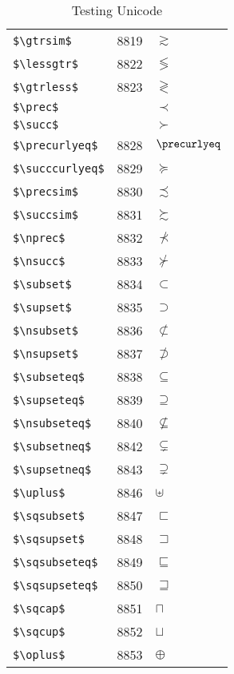 \documentclass{article}
\begin{document}
\begin{table}
\begin{center}
\begin{tabular}{lll}
\verb#$\gtrsim$# & 8819 & $\gtrsim$\\ 
\verb#$\lessgtr$# & 8822 & $\lessgtr$\\ 
\verb#$\gtrless$# & 8823 & $\gtrless$\\ 
\verb#$\prec$# &  & $\prec$\\ 
\verb#$\succ$# &  & $\succ$\\ 
\verb#$\precurlyeq$# & 8828 & $\precurlyeq$\\ 
\verb#$\succcurlyeq$# & 8829 & $\succcurlyeq$\\ 
\verb#$\precsim$# & 8830 & $\precsim$\\ 
\verb#$\succsim$# & 8831 & $\succsim$\\ 
\verb#$\nprec$# & 8832 & $\nprec$\\ 
\verb#$\nsucc$# & 8833 & $\nsucc$\\ 
\verb#$\subset$# & 8834 & $\subset$\\ 
\verb#$\supset$# & 8835 & $\supset$\\ 
\verb#$\nsubset$# & 8836 & $\nsubset$\\ 
\verb#$\nsupset$# & 8837 & $\nsupset$\\ 
\verb#$\subseteq$# & 8838 & $\subseteq$\\ 
\verb#$\supseteq$# & 8839 & $\supseteq$\\ 
\verb#$\nsubseteq$# & 8840 & $\nsubseteq$\\ 
\verb#$\subsetneq$# & 8842 & $\subsetneq$\\ 
\verb#$\supsetneq$# & 8843 & $\supsetneq$\\ 
\verb#$\uplus$# & 8846 & $\uplus$\\ 
\verb#$\sqsubset$# & 8847 & $\sqsubset$\\ 
\verb#$\sqsupset$# & 8848 & $\sqsupset$\\ 
\verb#$\sqsubseteq$# & 8849 & $\sqsubseteq$\\ 
\verb#$\sqsupseteq$# & 8850 & $\sqsupseteq$\\ 
\verb#$\sqcap$# & 8851 & $\sqcap$\\ 
\verb#$\sqcup$# & 8852 & $\sqcup$\\ 
\verb#$\oplus$# & 8853 & $\oplus$\\ 
\end{tabular}
\end{center}
\caption{Testing Unicode}
\end{table}
\clearpage
\end{document}
